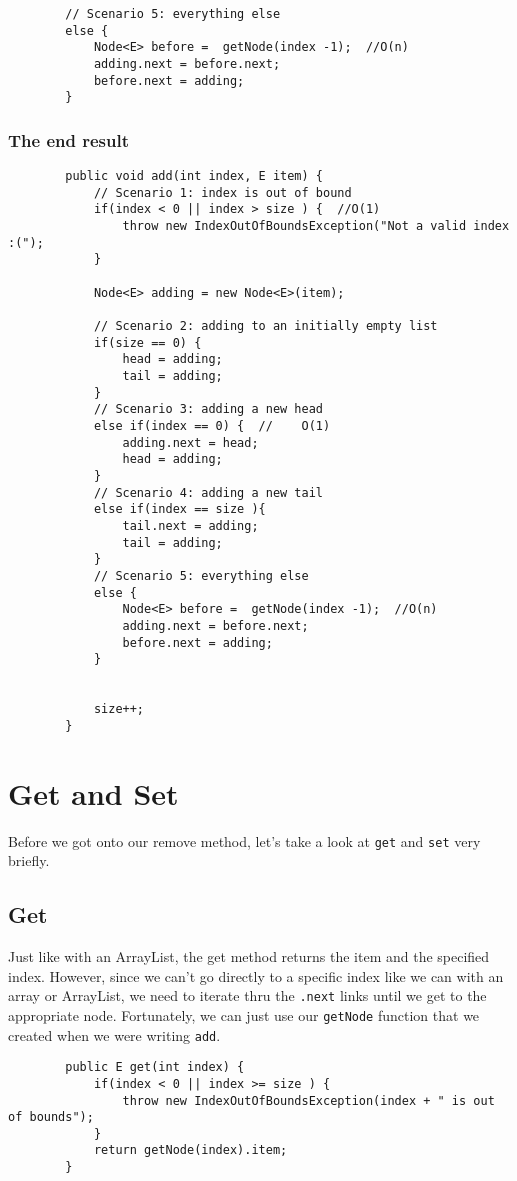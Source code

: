 	\begin{verbatim}
		// Scenario 5: everything else
		else {
			Node<E> before =  getNode(index -1);  //O(n)
			adding.next = before.next;
			before.next = adding;
		}	
	\end{verbatim}
	
	\subsubsection{The end result}
	\begin{verbatim}
		public void add(int index, E item) {
			// Scenario 1: index is out of bound
			if(index < 0 || index > size ) {  //O(1)
				throw new IndexOutOfBoundsException("Not a valid index :(");
			}
			
			Node<E> adding = new Node<E>(item);
			
			// Scenario 2: adding to an initially empty list
			if(size == 0) {
				head = adding;
				tail = adding;
			}
			// Scenario 3: adding a new head
			else if(index == 0) {  //    O(1)
				adding.next = head;
				head = adding;
			}
			// Scenario 4: adding a new tail
			else if(index == size ){
				tail.next = adding;
				tail = adding;
			}
			// Scenario 5: everything else
			else {
				Node<E> before =  getNode(index -1);  //O(n)
				adding.next = before.next;
				before.next = adding;
			}
			
			
			size++;
		}
	\end{verbatim}
	
	
	
	\section{Get and Set}
	Before we got onto our remove method, let's take a look at \texttt{get} and \texttt{set} very briefly.
	
	\subsection{Get}
	Just like with an ArrayList, the get method returns the item and the specified index.  
	However, since we can't go directly to a specific index like we can with an array or ArrayList, we need to iterate thru the \texttt{.next} links until we get to the appropriate node.
	Fortunately, we can just use our \texttt{getNode} function that we created when we were writing \texttt{add}.
	
	
	
	\begin{verbatim}
		public E get(int index) {
			if(index < 0 || index >= size ) { 
				throw new IndexOutOfBoundsException(index + " is out of bounds");
			}
			return getNode(index).item;
		}
	\end{verbatim}
	
